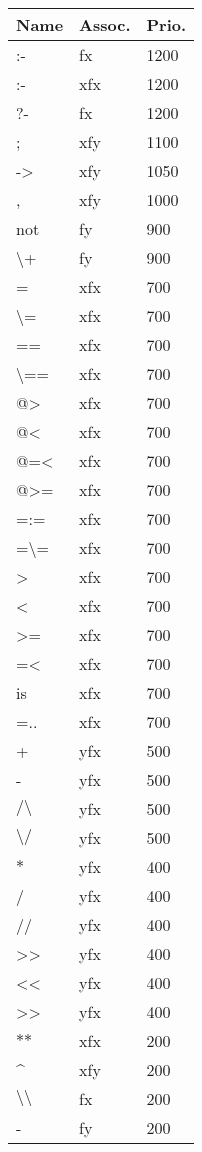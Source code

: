 \begin{table}[h]
    \begin{center}{\small\tt
    \begin{tabular}{p{2cm}|p{1cm}|p{1cm}}\hline\hline
    Name & Assoc. & Prio. \\ \hline\hline
    :-      &   fx  &   1200 \\
    :-      &   xfx &   1200 \\
    ?-      &   fx  &   1200 \\
    ;       &   xfy &   1100 \\
    ->      &   xfy &   1050 \\
    ,       &   xfy &   1000 \\
    not     &   fy  &   900 \\
    $\setminus$+   &   fy   & 900   \\
    =       &   xfx &   700 \\
    $\setminus$=    &  xfx  &   700 \\
    ==      &   xfx &   700 \\
    $\setminus$==   &  xfx  &   700 \\
    @>      &   xfx & 700   \\
    @<      &   xfx & 700   \\
    @=<    &   xfx & 700   \\
    @>=    &   xfx & 700   \\
    =:=    &   xfx & 700   \\
    =$\setminus$=   &   xfx & 700   \\
    >      &   xfx & 700   \\
    <      &   xfx & 700   \\
    >=      &   xfx & 700   \\
    =<      &   xfx & 700   \\
    is      &   xfx &   700 \\
    =..     &   xfx & 700 \\
    +       &   yfx & 500 \\
    -       &   yfx & 500 \\
    $/\setminus$    &   yfx &   500 \\
    $\setminus/$    &   yfx &   500 \\
    $\ast$  &   yfx & 400 \\
    /       &   yfx & 400 \\
    //      &   yfx & 400 \\
    >>      &   yfx & 400 \\
    <<      &   yfx & 400 \\
    >>      &   yfx & 400 \\
    $\ast$$\ast$  &   xfx & 200 \\
    \textasciicircum  &   xfy & 200 \\
    $\setminus$$\setminus$      &   fx & 200 \\
    -       &   fy & 200 \\
    \hline\hline
    \end{tabular}
    }\end{center}
\end{table}

